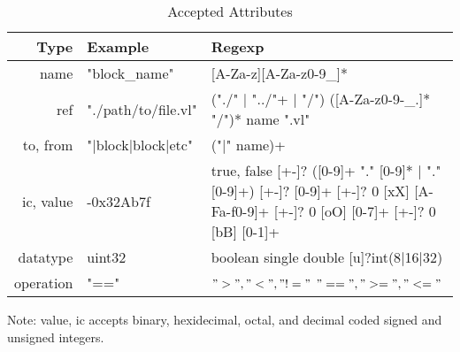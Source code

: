 \begin{longtable}[c]{ |r|l|l| }
    \caption{Accepted Attributes}
    \label{table:attr}
    \hline
    Type & Example & Regexp  \\
    \hline
    \hline
    name & "block\_name" & [A-Za-z][A-Za-z0-9\_]* \\
    \hline
    ref & "./path/to/file.vl" & \specialcell{("./" $|$ "../"+ $|$ "/") \\
                                        ([A-Za-z0-9-\_.]* "/")* name ".vl"} \\
    \hline
    to, from & "$|$block$|$block$|$etc" & ("$|$" name)+ \\
    \hline
    ic, value & -0x32Ab7f & \specialcell{true, false \\ {[+-]}? ([0-9]+ "." [0-9]* $|$ "." [0-9]+) \\
                                                        {[+-]}? [0-9]+ \\
                                                      {[+-]}? 0 [xX] [A-Fa-f0-9]+ \\
                                                      {[+-]}? 0 [oO] [0-7]+ \\
                                                  {[+-]}? 0 [bB] [0-1]+ } \\
    \hline
    datatype & uint32 & \specialcell{boolean \\ single \\ double \\ 
                                    {[u]}?int(8$|$16$|$32)} \\
    \hline
    operation & "==" & \specialcell{$">", "<", "!="$ \\ $"==", ">=", "<="$} \\
    \hline
\end{longtable}
Note: value, ic accepts binary, hexidecimal, octal, and decimal coded signed and unsigned 
integers.

